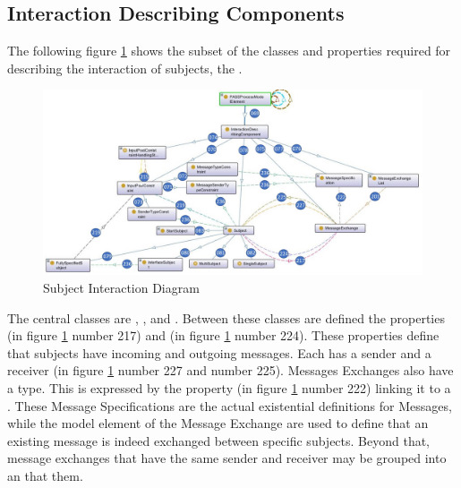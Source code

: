 \subsection{Interaction Describing Components}

The following figure \ref{fig:ontogrsubjectinteraction} shows the subset of the classes and properties required for describing the interaction of subjects, the .

\begin{figure}[htbp]
	\centering
	\includegraphics[width=1.0\linewidth]{Figures/Ontology/SubjectInteraction/OntoGrSubjectInteraction}
	\caption[Subject Interaction Diagram]{Subject Interaction Diagram}
	\label{fig:ontogrsubjectinteraction}
\end{figure}

The central classes are , , and . Between these classes are defined the properties   (in figure \ref{fig:ontogrsubjectinteraction} number 217) and   (in figure \ref{fig:ontogrsubjectinteraction} number 224). These properties define that subjects have incoming and outgoing messages. Each  has a sender and a receiver (in figure \ref{fig:ontogrsubjectinteraction} number 227 and number 225). Messages Exchanges also have a type. This is expressed by the property  (in figure \ref{fig:ontogrsubjectinteraction} number 222) linking it to a . These Message Specifications are the actual existential definitions for Messages, while the model element of the Message Exchange are used to define that an existing message is indeed exchanged between specific subjects. Beyond that, message exchanges that have the same sender and receiver may be grouped into an  that  them.

